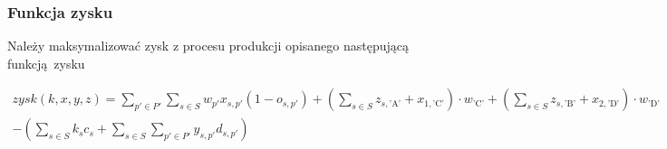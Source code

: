 \documentclass[a4paper,11pt]{article}
\theoremstyle{mytheor}
\begin{document}
\subsubsection*{Funkcja zysku}
Należy maksymalizować zysk z procesu produkcji opisanego następującą funkcją zysku

\begin{multline*}
    zysk(k, x, y, z) = \sum_{p'\in P'} \sum_{s \in S} w_{p'} x_{s, p'} (1 - o_{s, p'}) + (\sum_{s\in S} z_{s, \text{'A'}} + x_{1, \text{'C'}}) \cdot w_{\text{'C'}} + (\sum_{s\in S} z_{s, \text{'B'}} + x_{2, \text{'D'}}) \cdot w_{\text{'D'}} \\
    - (
    \sum_{s\in S} k_s c_s + \sum_{s\in S} \sum_{p'\in P'} y_{s,p'}d_{s,p'}
    )
\end{multline*}
\end{document}
